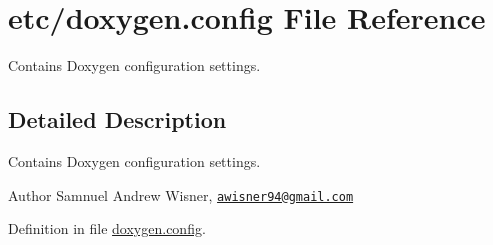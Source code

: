 \hypertarget{doxygen_8config}{\section{etc/doxygen.config File Reference}
\label{doxygen_8config}
}


Contains Doxygen configuration settings.  




\subsection{Detailed Description}
Contains Doxygen configuration settings. 

\begin{DoxyAuthor}{Author}
Samnuel Andrew Wisner, \href{mailto:awisner94@gmail.com}{\tt awisner94@gmail.\+com} 
\end{DoxyAuthor}


Definition in file \hyperlink{doxygen_8config_source}{doxygen.\+config}.


